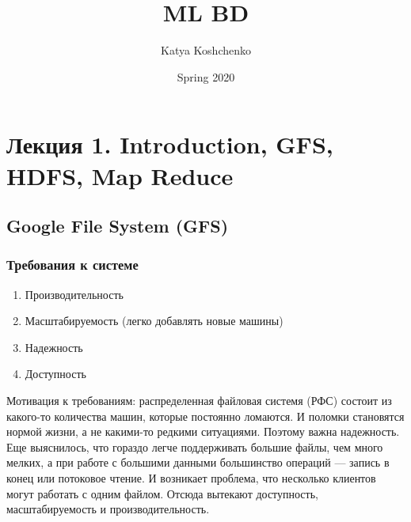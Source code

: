 \documentclass[12pt]{article}
\title{ML BD}
\date{Spring 2020}
\begin{document}
\author{Katya Koshchenko}
\maketitle

\section{Лекция 1. Introduction, GFS, HDFS, Map Reduce}

\subsection{Google File System (GFS)}
    \subsubsection{Требования к системе}

    \begin{enumerate}
        \item Производительность
        \item Масштабируемость (легко добавлять новые машины)
        \item Надежность
        \item Доступность
    \end{enumerate}
    \quad Мотивация к требованиям: распределенная файловая системя (РФС) состоит из какого-то количества машин, которые постоянно ломаются. И поломки становятся нормой жизни, а не какими-то редкими ситуациями. Поэтому важна надежность. Еще выяснилось, что гораздо легче поддерживать большие файлы, чем много мелких, а при работе с большими данными большинство операций --- запись в конец или потоковое чтение. И возникает проблема, что несколько клиентов могут работать с одним файлом. Отсюда вытекают доступность, масштабируемость и производительность.
    
\end{document}
